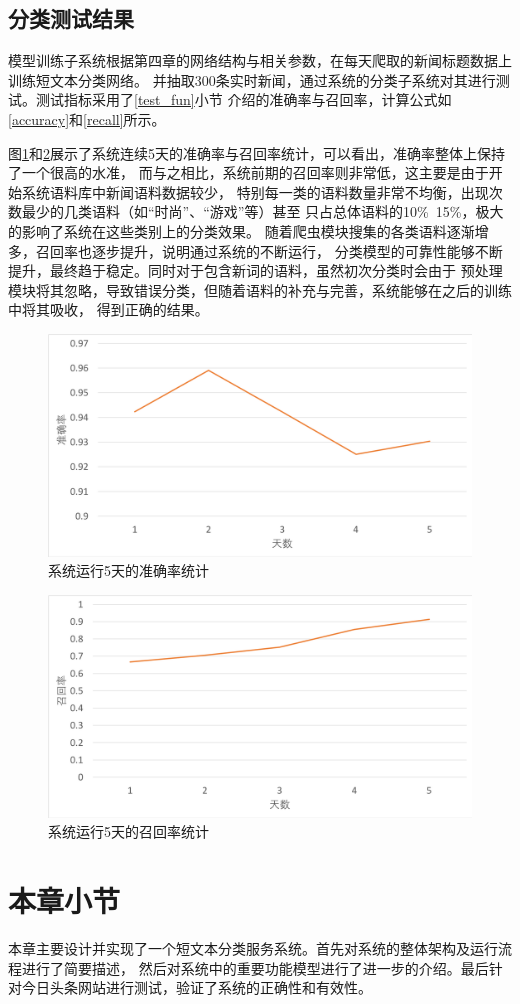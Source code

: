 \documentclass{standalone}
\begin{document}
\subsection{分类测试结果}
模型训练子系统根据第四章的网络结构与相关参数，在每天爬取的新闻标题数据上训练短文本分类网络。
并抽取300条实时新闻，通过系统的分类子系统对其进行测试。测试指标采用了\ref{test_fun}小节
介绍的准确率与召回率，计算公式如\ref{accuracy}和\ref{recall}所示。

图\ref{acc}和\ref{recall_pic}展示了系统连续5天的准确率与召回率统计，可以看出，准确率整体上保持了一个很高的水准，
而与之相比，系统前期的召回率则非常低，这主要是由于开始系统语料库中新闻语料数据较少，
特别每一类的语料数量非常不均衡，出现次数最少的几类语料（如“时尚”、“游戏”等）甚至
只占总体语料的10\%~15\%，极大的影响了系统在这些类别上的分类效果。
随着爬虫模块搜集的各类语料逐渐增多，召回率也逐步提升，说明通过系统的不断运行，
分类模型的可靠性能够不断提升，最终趋于稳定。同时对于包含新词的语料，虽然初次分类时会由于
预处理模块将其忽略，导致错误分类，但随着语料的补充与完善，系统能够在之后的训练中将其吸收，
得到正确的结果。
\begin{figure}[!hbp]
    \includegraphics[scale=0.5]{picture/acc.png}
    \caption{系统运行5天的准确率统计}
    \label{acc}
\end{figure}
\begin{figure}[!hbp]
    \includegraphics[scale=0.5]{picture/recall.png}
    \caption{系统运行5天的召回率统计}
    \label{recall_pic}
\end{figure}

\section{本章小节}
本章主要设计并实现了一个短文本分类服务系统。首先对系统的整体架构及运行流程进行了简要描述，
然后对系统中的重要功能模型进行了进一步的介绍。最后针对今日头条网站进行测试，验证了系统的正确性和有效性。
\end{document}
